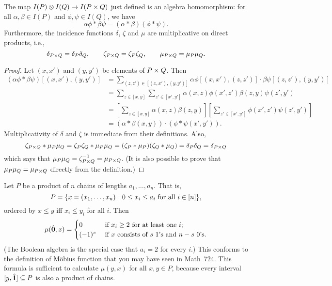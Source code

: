 \begin{proposition}\label{incidence-product}
The map $I(P)\otimes I(Q)\to I(P\times Q)$ just defined is an algebra homomorphism: for all
$\alpha,\beta\in I(P)$ and $\phi,\psi\in I(Q)$, we have
\[\alpha\phi*\beta\psi = (\alpha*\beta)(\phi*\psi).\]
Furthermore, the incidence functions $\delta$, $\zeta$ and $\mu$ are multiplicative on direct products, i.e.,
\[\delta_{P\times Q}=\delta_P\delta_Q, \qquad \zeta_{P\times Q}=\zeta_P\zeta_Q,\qquad \mu_{P\times Q}=\mu_P\mu_Q.\]
\end{proposition}

\begin{proof} Let $(x,x')$ and $(y,y')$ be elements of $P\times Q$.  Then
\begin{align*}
(\alpha\phi*\beta\psi) [(x,x'),(y,y')]
&= \sum_{(z,z')\in[(x,x'),(y,y')]} \alpha\phi[(x,x'),(z,z')]\cdot\beta\psi[(z,z'),(y,y')]\\
&= \sum_{z\in[x,y]} \sum_{z'\in[x',y']} \alpha(x,z)\phi(x',z')\beta(z,y)\psi(z',y')\\
&= \left[\sum_{z\in[x,y]}\alpha(x,z)\beta(z,y)\right] \left[\sum_{z'\in[x',y']} \phi(x',z') \psi(z',y')\right]\\
&= (\alpha*\beta(x,y))\cdot(\phi*\psi(x',y')).
\end{align*}
Multiplicativity of $\delta$ and $\zeta$ is immediate from their definitions.  Also,
\[\zeta_{P\times Q}*\mu_P\mu_Q = \zeta_P\zeta_Q*\mu_P\mu_Q = (\zeta_P*\mu_P)(\zeta_Q*\mu_Q) = \delta_P\delta_Q = \delta_{P\times Q}\]
which says that $\mu_P\mu_Q = \zeta_{P\times Q}^{-1} = \mu_{P\times Q}$.
(It is also possible to prove that $\mu_P\mu_Q = \mu_{P\times Q}$ directly from the definition.)
\end{proof}

\begin{example}
Let $P$ be a product of $n$ chains
of lengths $a_1,\dots,a_n$.  That is,
\[P = \{x=(x_1,\dots,x_n) ~|~ 0\leq x_i \leq a_i \text{ for all } i \in[n]\},\]
ordered by $x\leq y$ iff $x_i\leq y_i$ for all $i$.  Then
\[\mu(\hat{\mathbf{0}},x) = \begin{cases}
    0 & \text{ if $x_i\geq 2$ for at least one $i$;}\\
    (-1)^s & \text{ if $x$ consists of $s$ 1's and $n-s$ 0's.}
\end{cases}\]
(The Boolean algebra is the special case that $a_i=2$ for every $i$.)  This conforms
to the definition of M\"obius function that you may have seen in Math~724.  This formula
is sufficient to calculate $\mu(y,x)$ for all $x,y\in P$, because every interval
$[y,\hat{\mathbf{1}}]\subseteq P$ is also a product of chains.
\end{example}

